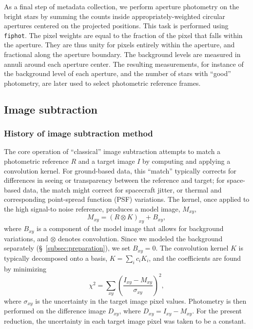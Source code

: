 \documentclass[12pt,twocolumn,tighten]{aastex62}
\begin{document}
As a final step of metadata collection, we perform aperture photometry on the
bright stars by summing the counts inside appropriately-weighted
circular apertures centered on the projected positions. This task is
performed using \texttt{fiphot}.
The pixel weights are equal to the fraction of the pixel
that falls within the aperture.  They are thus unity for pixels
entirely within the aperture, and fractional along the aperture
boundary. %
The background levels are measured in annuli around each aperture
center. 
The resulting measurements, for instance of the background level of
each aperture, and the number of stars with ``good'' photometry,
are later used to select photometric reference frames.


\subsection{Image subtraction}
\label{subsec:imagesubtraction}

\subsubsection{History of image subtraction method}
The core operation of ``classical'' image subtraction
attempts to match a photometric reference $R$ and a target image $I$ by 
computing and applying a convolution kernel.
For ground-based data, this ``match'' typically corrects for
differences in seeing or transparency between the reference and
target; for space-based data, the match might correct for spacecraft
jitter, or thermal and corresponding point-spread function (PSF)
variations.
The kernel, once applied to the high signal-to noise reference,
produces a model image, $M_{xy}$,
\begin{equation}
    M_{xy} = (R \otimes K)_{xy} + B_{xy},
    \label{eq:imagemodel}
\end{equation}
where $B_{xy}$ is a component of the model image that allows for
background variations, and $\otimes$ denotes convolution.
Since we modeled the background separately (\S~\ref{subsec:preparation}),
we set $B_{xy}=0$.
The convolution kernel $K$ is typically decomposed onto a
basis, $K = \sum_i c_i K_i$, and the coefficients are found
by minimizing
\begin{equation}
    \chi^2 = \sum_{xy} \left( \frac{I_{xy} - M_{xy}}{\sigma_{xy}} \right)^2,
    \label{eq:chisq_conv}
\end{equation}
where $\sigma_{xy}$ is the uncertainty in the target image pixel values.
Photometry is then performed on the difference image $D_{xy}$, where
$D_{xy} = I_{xy} - M_{xy}$.
For the present reduction, the uncertainty in each target image pixel was
taken to be a constant.	
\end{document}
